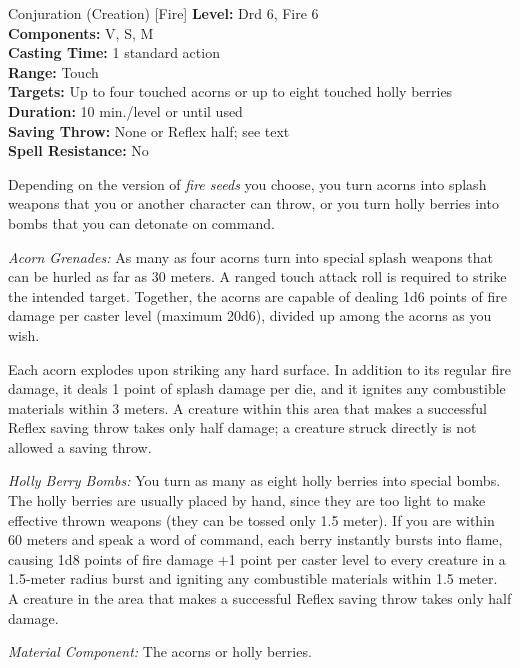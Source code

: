 {Conjuration (Creation) [Fire]}
{
	\textbf{Level:}
	Drd 6, Fire 6\\
	\textbf{Components:}
	V, S, M\\
	\textbf{Casting Time:}
	1 standard action\\
	\textbf{Range:}
	Touch\\
	\textbf{Targets:}
	Up to four touched acorns or up to eight touched holly berries\\
	\textbf{Duration:}
	10 min./level or until used\\
	\textbf{Saving Throw:}
	None or Reflex half; see text\\
	\textbf{Spell Resistance:}
	No\\
}
{
	Depending on the version of \emph{fire seeds} you choose, you turn acorns into splash weapons that you or another character can throw, or you turn holly berries into bombs that you can detonate on command.

	\textit{Acorn Grenades:}
	As many as four acorns turn into special splash weapons that can be hurled as far as 30 meters. A ranged touch attack roll is required to strike the intended target. Together, the acorns are capable of dealing 1d6 points of fire damage per caster level (maximum 20d6), divided up among the acorns as you wish.

	Each acorn explodes upon striking any hard surface. In addition to its regular fire damage, it deals 1 point of splash damage per die, and it ignites any combustible materials within 3 meters. A creature within this area that makes a successful Reflex saving throw takes only half damage; a creature struck directly is not allowed a saving throw.

	\textit{Holly Berry Bombs:}
	You turn as many as eight holly berries into special bombs. The holly berries are usually placed by hand, since they are too light to make effective thrown weapons (they can be tossed only 1.5 meter). If you are within 60 meters and speak a word of command, each berry instantly bursts into flame, causing 1d8 points of fire damage +1 point per caster level to every creature in a 1.5-meter radius burst and igniting any combustible materials within 1.5 meter. A creature in the area that makes a successful Reflex saving throw takes only half damage.

	\textit{Material Component:}
	The acorns or holly berries.

}
